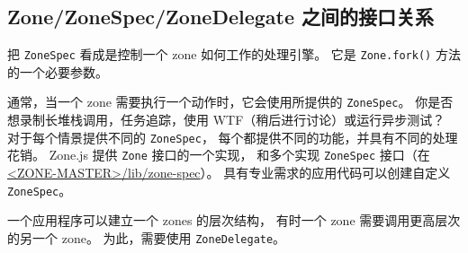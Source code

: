 \subsection{Zone/ZoneSpec/ZoneDelegate 之间的接口关系}


把 \texttt{ZoneSpec} 看成是控制一个 zone 如何工作的处理引擎。
它是 \texttt{Zone.fork()} 方法的一个必要参数。




通常，当一个 zone 需要执行一个动作时，它会使用所提供的 \texttt{ZoneSpec}。
你是否想录制长堆栈调用，任务追踪，使用 WTF（稍后进行讨论）或运行异步测试？
对于每个情景提供不同的 \texttt{ZoneSpec}，
每个都提供不同的功能，并具有不同的处理花销。
Zone.js 提供 \texttt{Zone} 接口的一个实现，
和多个实现 \texttt{ZoneSpec} 接口（在
\href{https://github.com/angular/zone.js/tree/master/lib/zone-spec}
{<ZONE-MASTER>/lib/zone-spec}）。
具有专业需求的应用代码可以创建自定义 \texttt{ZoneSpec}。


一个应用程序可以建立一个 zones 的层次结构，
有时一个 zone 需要调用更高层次的另一个 zone。
为此，需要使用 \texttt{ZoneDelegate}。
